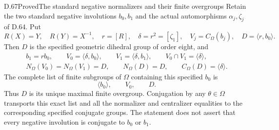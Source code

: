 \begin{claim}{D.67}{Proved}{The standard negative normalizers and their finite overgroups}
Retain the two standard negative involutions $b_0,b_1$
and the actual automorphisms $\alpha_j,\zeta_j$ of D.64.
Put
\[
 R(X)=Y,\quad R(Y)=X^{-1},\quad r=[R],\quad
 \delta=r^2=[\zeta_1],\quad
 V_j=C_\Omega(b_j),\quad D=\langle r,b_0\rangle .          \tag{D.67a}
\]
Then $D$ is the specified geometric dihedral group of order
eight, and
\[
 \begin{gathered}
 b_1=rb_0,\qquad
 V_0=\langle\delta,b_0\rangle,\qquad
 V_1=\langle\delta,b_1\rangle,\qquad
 V_0\cap V_1=\langle\delta\rangle,\\
 N_\Omega(V_0)=N_\Omega(V_1)=D,\qquad
 N_\Omega(D)=D,\qquad C_\Omega(D)=\langle\delta\rangle.
 \end{gathered}                                               \tag{D.67b}
\]
The complete list of finite subgroups of $\Omega$ containing
this specified $b_0$ is
\[
                     \langle b_0\rangle,\qquad V_0,\qquad D.
                                                               \tag{D.67c}
\]
Thus $D$ is its unique maximal finite overgroup. Conjugation
by any $\theta\in\Omega$ transports this exact list and all
the normalizer and centralizer equalities to the corresponding
specified conjugate groups. The statement does not assert
that every negative involution is conjugate to $b_0$ or $b_1$.
\end{claim}
